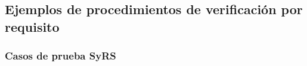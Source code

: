 

\subsection{Ejemplos de procedimientos de verificación por requisito}

\newcommand{\TCID}[1]{\textbf{VT-ID:} #1}
\newcommand{\TCMethod}[1]{\textbf{Método(s):} #1}
\newcommand{\TCObj}[1]{\textbf{Objetivo:} #1}
\newcommand{\TCPre}[1]{\textbf{Precondiciones:} #1}
\newcommand{\TCSetup}[1]{\textbf{Setup/Instrumentación:} #1}
\newcommand{\TCData}[1]{\textbf{Datos a registrar:} #1}
\newcommand{\TCAccept}[1]{\textbf{Criterio de aceptación:} #1}
\newcommand{\TCTrace}[1]{\textbf{Trazabilidad:} #1}
\newenvironment{tcblock}{%
  \begin{itemize}
    \setlength{\itemsep}{0.25em}
    \setlength{\parskip}{0em}
    \setlength{\parsep}{0em}
    \setlength{\leftmargin}{1.5em}
}{\end{itemize}}

\subsubsection{Casos de prueba SyRS}

